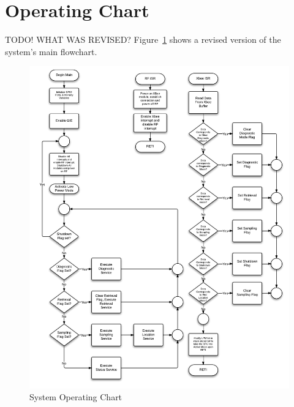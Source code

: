 \section{Operating Chart}

TODO! WHAT WAS REVISED?
Figure~\ref{fig:systemFlowchart} shows a revised version of the system's main flowchart.

\begin{figure}[H]
	\centering
	\includegraphics[width=\textwidth]{img/SystemFlowchart}
	\caption{System Operating Chart \label{fig:systemFlowchart}}
\end{figure}